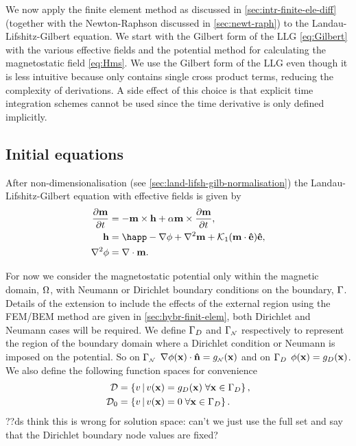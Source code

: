 We now apply the finite element method as discussed in \cref{sec:intr-finite-ele-diff} (together with the Newton-Raphson discussed in \cref{sec:newt-raph}) to the Landau-Lifshitz-Gilbert equation.
We start with the Gilbert form of the LLG \cref{eq:Gilbert} with the various effective fields and the potential method for calculating the magnetostatic field \cref{eq:Hms}.
We use the Gilbert form of the LLG even though it is less intuitive because only contains single cross product terms, reducing the complexity of derivations.
A side effect of this choice is that explicit time integration schemes cannot be used since the time derivative is only defined implicitly.

\subsection{Initial equations}

After non-dimensionalisation (see \cref{sec:land-lifsh-gilb-normalisation}) the Landau-Lifshitz-Gilbert equation with effective fields is given by
\begin{equation}
  \begin{aligned}
    \dmdt &= - \mv \times \hv + \alpha \mv \times \dmdt, \\
    \hv &= \happ - \nabla \phim + \lap \mv + \kone (\mv \cdot \ev) \ev, \\
    \lap \phim &= \div \mv.
    \label{eqn:ndllg-starting}
  \end{aligned}
\end{equation}

For now we consider the magnetostatic potential only within the magnetic domain, $\Omega$, with Neumann or Dirichlet boundary conditions on the boundary, ${\Gamma}$. 
Details of the extension to include the effects of the external region using the FEM/BEM method are given in \cref{sec:hybr-finit-elem}, both Dirichlet and Neumann cases will be required.
We define ${\Gamma}_D$ and ${\Gamma}_{\scriptscriptstyle{\mathcal{N}}}$ respectively to represent the region of the boundary domain where a Dirichlet condition or Neumann is imposed on the potential.
So on ${\Gamma}_{\scriptscriptstyle{\mathcal{N}}}$ $\nabla \phi(\mathbf{x}) \cdot \mathbf{\hat{n}} = g_{\scriptscriptstyle{\mathcal{N}}}(\mathbf{x})$ and on ${\Gamma}_D$ $\phi(\mathbf{x}) = g_D(\mathbf{x})$.
We also define the following function spaces for convenience
\begin{equation}
\begin{aligned}
  \label{eq:037}
  \mathcal{D} & = \left\{ { v \,|\, v(\mathbf{x}) = g_D(\mathbf{x}) \; \forall \mathbf{x} \in {\Gamma}_D } \right\}, \\
  \mathcal{D}_0 &= \left\{ { v \,|\, v(\mathbf{x}) = 0 \; \forall \mathbf{x} \in {\Gamma}_D } \right\}.
\end{aligned}
\end{equation}
??ds think this is wrong for solution space: can't we just use the full set and say that the Dirichlet boundary node values are fixed? 

